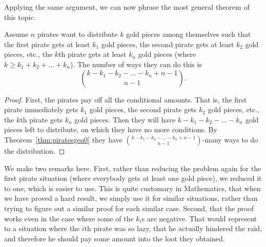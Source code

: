 Applying the same argument, 
we can now phrase the most general theorem of this topic. 

\begin{theorem}\label{thm:pirates}
Assume $n$ pirates want to distribute $k$ gold pieces among themselves such that 
the first pirate gets at least $k_1$ gold pieces, 
the second pirate gets at least $k_2$ gold pieces, etc., 
the $k$th pirate gets at least $k_n$ gold pieces
(where $k\geq k_1 + k_2 + \dots + k_n$). 
The number of ways they can do this is 
\[
\binom{k-k_1-k_2 - \dots - k_n + n-1}{n-1}.
\] 
\end{theorem}

\begin{proof}
First, the pirates pay off all the conditional amounts. 
That is, the first pirate immediately gets $k_1$ gold pieces, 
the second pirate gets $k_2$ gold pieces, etc., 
the $k$th pirate gets $k_n$ gold pieces. 
Then they will have $k-k_1-k_2 - \dots -k_n$ gold pieces left to distribute, 
on which they have no more conditions. 
By Theorem~\ref{thm:piratesgeq0} they have $\binom{k-k_1-k_2 - \dots - k_n + n-1}{n-1}$-many ways to do the distribution. 
\end{proof}

We make two remarks here. 
First, 
rather than reducing the problem again for the first pirate situation (where everybody gets at least one gold piece), 
we reduced it to one, which is easier to use. 
This is quite customary in Mathematics, 
that when we have proved a hard result, 
we simply use it for similar situations, rather than trying to figure out a similar proof for each similar case. 
Second, that the proof works even in the case where some of the $k_i$s are negative. 
That would represent to a situation where the $i$th pirate was so lazy, 
that he actually hindered the raid, 
and therefore he should pay some amount into the loot they obtained. 

